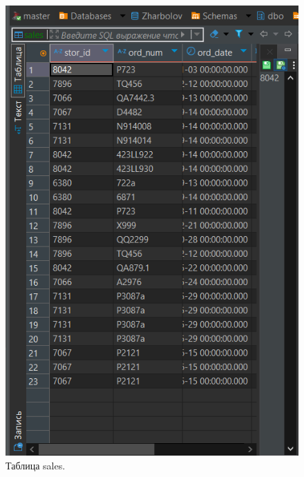 \begin{figure}[h!]
\begin{minipage}[p]{0.45\linewidth}
        \includegraphics[width=0.8\linewidth]{Pic/lab3/DataSale.PNG}
        \caption{Таблица sales.}
    \end{minipage}
    
\end{figure}

